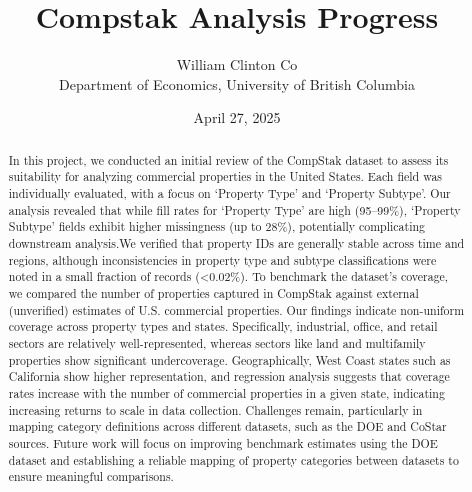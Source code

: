 \documentclass[
  12pt]{article}
\begin{document}
\def\spacingset#1{\renewcommand{\baselinestretch}%
{#1}\small\normalsize} \spacingset{1}



\date{April 27, 2025}
\title{\bf Compstak Analysis Progress}
\author{
William Clinton Co\\
Department of Economics, University of British Columbia\\
}
\maketitle

\bigskip
\bigskip
\begin{abstract}
In this project, we conducted an initial review of the CompStak dataset
to assess its suitability for analyzing commercial properties in the
United States. Each field was individually evaluated, with a focus on
`Property Type' and `Property Subtype'. Our analysis revealed that while
fill rates for `Property Type' are high (95--99\%), `Property Subtype'
fields exhibit higher missingness (up to 28\%), potentially complicating
downstream analysis.We verified that property IDs are generally stable
across time and regions, although inconsistencies in property type and
subtype classifications were noted in a small fraction of records
(\textless0.02\%). To benchmark the dataset's coverage, we compared the
number of properties captured in CompStak against external (unverified)
estimates of U.S. commercial properties. Our findings indicate
non-uniform coverage across property types and states. Specifically,
industrial, office, and retail sectors are relatively well-represented,
whereas sectors like land and multifamily properties show significant
undercoverage. Geographically, West Coast states such as California show
higher representation, and regression analysis suggests that coverage
rates increase with the number of commercial properties in a given
state, indicating increasing returns to scale in data collection.
Challenges remain, particularly in mapping category definitions across
different datasets, such as the DOE and CoStar sources. Future work will
focus on improving benchmark estimates using the DOE dataset and
establishing a reliable mapping of property categories between datasets
to ensure meaningful comparisons.
\end{abstract}


\newpage
\spacingset{1.9} %
\end{document}
